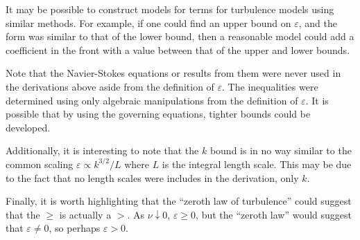 \documentclass[ccbysa,note]{bmtreport}
\begin{document}
It may be possible to construct models for terms for turbulence models using similar methods. For example, if one could find an upper bound on $\varepsilon$, and the form was similar to that of the lower bound, then a reasonable model could add a coefficient in the front with a value between that of the upper and lower bounds.

Note that the Navier-Stokes equations or results from them were never used in the derivations above aside from the definition of $\varepsilon$. The inequalities were determined using only algebraic manipulations from the definition of $\varepsilon$. It is possible that by using the governing equations, tighter bounds could be developed.

Additionally, it is interesting to note that the $k$ bound is in no way similar to the common scaling $\varepsilon \varpropto k^{3/2} / L$ where $L$ is the integral length scale. This may be due to the fact that no length scales were includes in the derivation, only $k$.

Finally, it is worth highlighting that the ``zeroth law of turbulence'' could suggest that the $\geq$ is actually a $>$. As $\nu \downarrow 0$, $\varepsilon \geq 0$, but the ``zeroth law'' would suggest that $\varepsilon \neq 0$, so perhaps $\varepsilon > 0$.

\end{document}
